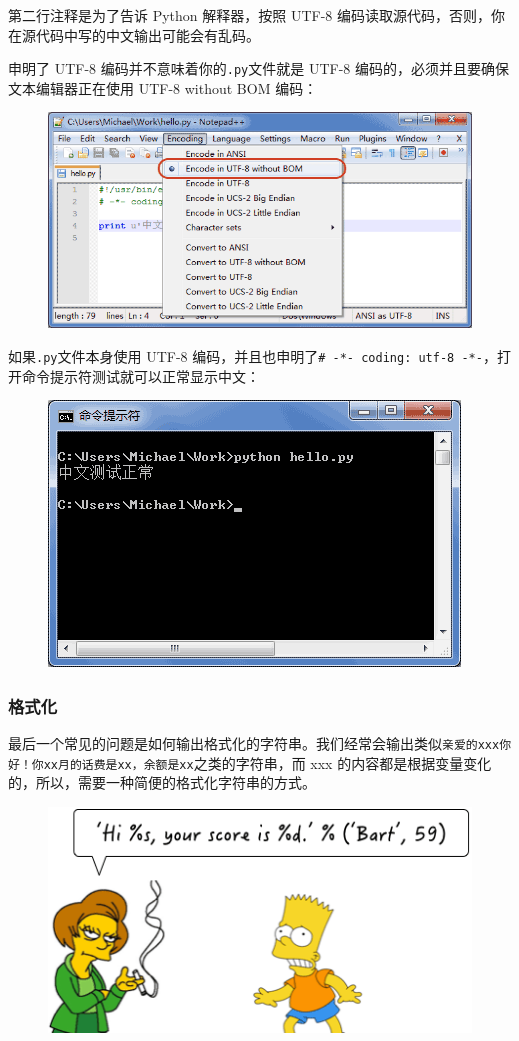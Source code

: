 第二行注释是为了告诉 Python 解释器，按照 UTF-8
编码读取源代码，否则，你在源代码中写的中文输出可能会有乱码。

申明了 UTF-8 编码并不意味着你的\texttt{.py}文件就是 UTF-8
编码的，必须并且要确保文本编辑器正在使用 UTF-8 without BOM 编码：

 
 \begin{figure}[htp]
	\centering
	\includegraphics[width=0.6\linewidth]{fig/1008802356788736.png}
\end{figure}


如果\texttt{.py}文件本身使用 UTF-8
编码，并且也申明了\texttt{\#\ -*-\ coding:\ utf-8\ -*-}，打开命令提示符测试就可以正常显示中文：

 
 \begin{figure}[htp]
	\centering
	\includegraphics[width=0.6\linewidth]{fig/1008802515054144.png}
\end{figure}


\hypertarget{ux683cux5f0fux5316}{%
\subsubsection{格式化}\label{ux683cux5f0fux5316}}

最后一个常见的问题是如何输出格式化的字符串。我们经常会输出类似\texttt{\textquotesingle{}亲爱的xxx你好！你xx月的话费是xx，余额是xx\textquotesingle{}}之类的字符串，而
xxx 的内容都是根据变量变化的，所以，需要一种简便的格式化字符串的方式。

 
 \begin{figure}[htp]
	\centering
	\includegraphics[width=0.6\linewidth]{fig/9288179064464320.png}
\end{figure}


